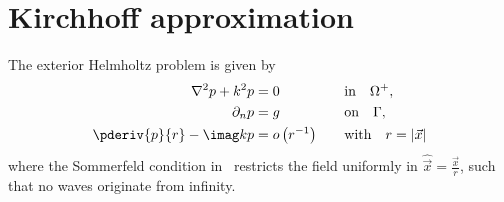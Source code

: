 \section{Kirchhoff approximation}
\label{Sec4:Kirchhoffs}
The exterior Helmholtz problem is given by
\begin{alignat}{3}
	\nabla^2 p + k^2 p &= 0 	&&\text{in}\quad \Omega^+,\label{Eq4:HelmholtzEqn}\\
	\partial_n p &= g						&&\text{on}\quad \Gamma,\label{Eq4:HelmholtzEqnNeumannCond}\\
	\pderiv{p}{r}-\imag k p &= o\left(r^{-1}\right)\quad &&\text{with}\quad r=|\vec{x}|\label{Eq4:sommerfeldCond}
\end{alignat}
where the Sommerfeld condition in~ restricts the field uniformly in $\hat{\vec{x}}=\frac{\vec{x}}{r}$, such that no waves originate from infinity.

